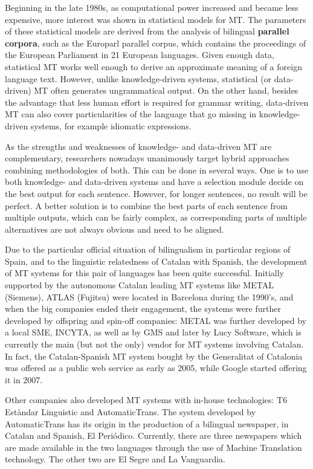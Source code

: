 \begin{multicols}{2}
Beginning in the late 1980s, as computational power increased and became less expensive, more interest was shown in statistical models for MT. The parameters of these statistical models are derived from the analysis of bilingual \textbf{parallel corpora}, such as the Europarl parallel corpus, which contains the proceedings of the European Parliament in 21 European languages. Given enough data, statistical MT works well enough to derive an approximate meaning of a foreign language text. However, unlike knowledge-driven systems, statistical (or data-driven) MT often generates ungrammatical output. On the other hand, besides the advantage that less human effort is required for grammar writing, data-driven MT can also cover particularities of the language that go missing in knowledge-driven systems, for example idiomatic expressions. 

As the strengths and weaknesses of knowledge- and data-driven MT are complementary, researchers nowadays unanimously target hybrid approaches combining methodologies of both. This can be done in several ways. One is to use both knowledge- and data-driven systems and have a selection module decide on the best output for each sentence. However, for longer sentences, no result will be perfect. A better solution is to combine the best parts of each sentence from multiple outputs, which can be fairly complex, as corresponding parts of multiple alternatives are not always obvious and need to be aligned. 

Due to the particular official situation of bilingualism in particular regions of Spain, and to the linguistic relatedness of Catalan with Spanish, the development of MT systems for this pair of languages has been quite successful. Initially supported by the autonomous Catalan leading MT systems like METAL (Siemens), ATLAS (Fujitsu) were located in Barcelona during the 1990’s, and when the big companies ended their engagement, the systems were further developed by offspring and spin-off companies: METAL was further developed by a local SME, INCYTA, as well as by GMS and later by Lucy Software, which is currently the main (but not the only) vendor for MT systems involving Catalan. In fact, the Catalan-Spanish MT system  bought by the Generalitat of Catalonia was offered as a public web service as early as 2005, while Google started offering it in 2007. 

Other companies also developed MT systems with in-house technologies: T6 Estàndar Linguistic and AutomaticTrans. The system developed by AutomaticTrans has its origin in the production of a bilingual newspaper, in Catalan and Spanish, El Periódico. Currently, there are three newspapers which are made available in the two languages  through the use of Machine Translation technology. The other two are El Segre and La Vanguardia. 


\end{multicols}
